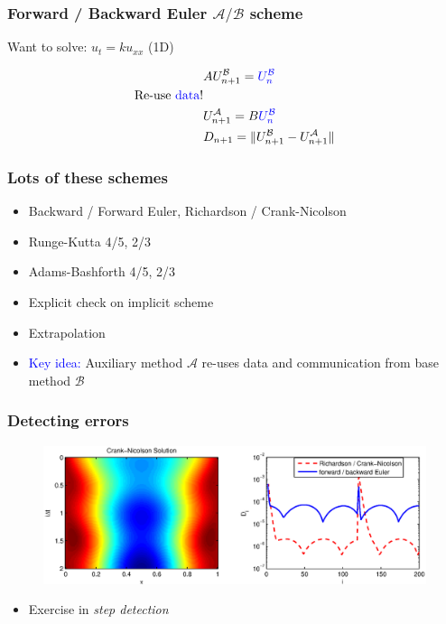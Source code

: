 \documentclass{beamer}
\newcommand{\A}{\mathcal{A}}
\newcommand{\B}{\mathcal{B}}
\begin{document}
\begin{frame}
\frametitle{Forward / Backward Euler $\A/\B$ scheme}
Want to solve: $u_t = ku_{xx}$ (1D)

\begin{align}
& AU^{\B}_{n+1} = \textcolor{blue}{U^{\B}_{n}} \nonumber \\
\text{Re-use \textcolor{blue}{data}!} \nonumber \\
& U^{\A}_{n+1} = B\textcolor{blue}{U^{\B}_{n}} \nonumber \\
& D_{n+1} = \| U^{\B}_{n+1} - U^{\A}_{n+1} \| \nonumber
\end{align}



\end{frame}



%
\begin{frame}
\frametitle{Lots of these schemes}

\begin{itemize}
\item Backward / Forward Euler, Richardson / Crank-Nicolson
\item Runge-Kutta 4/5, 2/3
\item Adams-Bashforth 4/5, 2/3
\item Explicit check on implicit scheme
\item Extrapolation
\end{itemize}

\pause
\begin{itemize}
\item \textcolor{blue}{Key idea:}  Auxiliary method $\A$ re-uses data and communication from base method $\B$
\end{itemize}

\end{frame}

%
\begin{frame}
\frametitle{Detecting errors}

\begin{figure}
  \centering
  \includegraphics[scale=0.5]{figs/heat_soln_diffs1.eps}
\end{figure}

\begin{itemize}
\item Exercise in \emph{step detection}
\end{itemize}

\end{frame}
\end{document}
